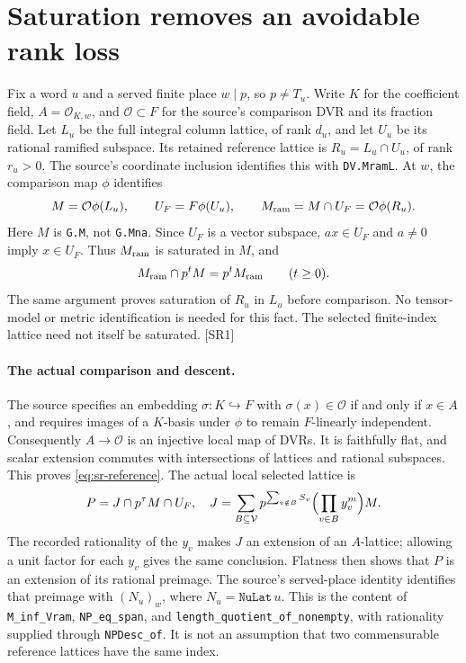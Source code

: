 \section{Saturation removes an avoidable rank loss}\label{sec:saturation}


Fix a word $u$ and a served finite place $w\mid p$, so $p\ne T_u$.
Write $K$ for the coefficient field, $A=\mathcal O_{K,w}$, and
$\mathcal O\subset F$ for the source's comparison DVR and its fraction field.
Let $L_u$ be the full integral column lattice, of rank $d_u$, and let
$U_u$ be its rational ramified subspace. Its retained reference lattice is
$R_u=L_u\cap U_u$, of rank $r_u>0$.
The source's coordinate inclusion identifies this with \texttt{DV.MramL}.
At $w$, the comparison map $\phi$ identifies
\begin{equation}\label{eq:sr-reference}
 M=\mathcal O\phi(L_u),\qquad
 U_F=F\phi(U_u),\qquad
 M_{\rm ram}=M\cap U_F=\mathcal O\phi(R_u).
\end{equation}
Here $M$ is \texttt{G.M}, not \texttt{G.Mna}. Since $U_F$ is a vector
subspace, $ax\in U_F$ and $a\ne0$ imply $x\in U_F$. Thus
$M_{\rm ram}$ is saturated in $M$, and
\[
 M_{\rm ram}\cap p^tM=p^tM_{\rm ram}\qquad(t\ge0).
\]
The same argument proves saturation of $R_u$ in $L_u$ before comparison.
No tensor-model or metric identification is needed for this fact.
The selected finite-index lattice need not itself be saturated. \textsf{[SR1]}

\paragraph{The actual comparison and descent.}
The source specifies an embedding $\sigma:K\hookrightarrow F$ with
$\sigma(x)\in\mathcal O$ if and only if $x\in A$, and requires images
of a $K$-basis under $\phi$ to remain $F$-linearly independent.
Consequently $A\to\mathcal O$ is an injective local map of DVRs.
It is faithfully flat, and scalar extension commutes with intersections
of lattices and rational subspaces. This proves \eqref{eq:sr-reference}.
The actual local selected lattice is
\[
 P=J\cap p^\tau M\cap U_F,
 \quad
 J=\sum_{B\subseteq\mathcal V}
 p^{\sum_{v\notin B}S_v}\Bigl(\prod_{v\in B}y_v^m\Bigr)M.
\]
The recorded rationality of the $y_v$ makes $J$ an extension of an
$A$-lattice; allowing a unit factor for each $y_v$ gives the same conclusion.
Flatness then shows that $P$ is an extension of its rational preimage.
The source's served-place identity identifies that preimage with
$(N_u)_w$, where $N_u=\texttt{NuLat}\,u$.
This is the content of \texttt{M\_inf\_Vram}, \texttt{NP\_eq\_span}, and
\texttt{length\_quotient\_of\_nonempty}, with rationality supplied through
\texttt{NPDesc\_of}. It is not an assumption that two commensurable
reference lattices have the same index.

